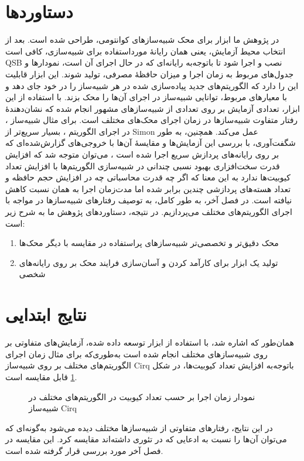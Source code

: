 \section{دستاوردها}
در پژوهش ما ابزار
برای محک شبیه‌سازهای کوانتومی، طراحی شده است. بعد از انتخاب محیط آزمایش، یعنی همان رایانهٔ مورداستفاده برای شبیه‌سازی، کافی است QSB نصب و اجرا شود تا باتوجه‌به رایانه‌ای که در حال اجرای آن است، نمودارها و جدول‌های مربوط به زمان اجرا و میزان حافظهٔ مصرفی، تولید شوند. این ابزار قابلیت این را دارد که الگوریتم‌های جدید پیاده‌سازی شده در هر شبیه‌ساز را در خود جای دهد و با معیارهای مربوط، توانایی شبیه‌ساز در اجرای آن‌ها را محک بزند. با استفاده از این ابزار، تعدادی آزمایش بر روی تعدادی از شبیه‌سازهای مشهور انجام شده که نشان‌دهندهٔ رفتار متفاوت شبیه‌سازها در زمان اجرای محک‌های مختلف است. برای مثال شبیه‌ساز
،
 در اجرای الگوریتم
،
بسیار سریع‌تر از Simon عمل می‌کند. همچنین، به طور شگفت‌آوری، با بررسی این آزمایش‌ها و مقایسهٔ آن‌ها با خروجی‌های گزارش‌شده‌ای که بر روی رایانه‌های پردازش سریع اجرا شده است
\cite{jamadagni_benchmarking_2024}،
می‌توان متوجه شد که افزایش قدرت سخت‌افزاری بهبود نسبی چندانی در شبیه‌سازی الگوریتم‌ها با افزایش تعداد کیوبیت‌ها ندارد به این معنا که اگر چه قدرت محاسباتی چه در افزایش حجم حافظه و تعداد هسته‌های پردازشی چندین برابر شده اما مدت‌زمان اجرا به همان نسبت کاهش نیافته است. در فصل آخر، به طور کامل، به توصیف رفتارهای شبیه‌سازها در مواجه با اجرای الگوریتم‌های مختلف می‌پردازیم. در نتیجه، دستاوردهای  پژوهش ما به شرح زیر است:
\begin{enumerate}[label=\arabic*{-}]
	\item محک دقیق‌تر و تخصصی‌تر شبیه‌سازهای پراستفاده در مقایسه با دیگر محک‌ها
	\item تولید یک ابزار برای کارآمد کردن و آسان‌سازی فرایند محک بر روی رایانه‌های شخصی
\end{enumerate}

\section{نتایج ابتدایی}
همان‌طور که اشاره شد، با استفاده از ابزار توسعه داده شده، آزمایش‌های متفاوتی بر روی شبیه‌سازهای مختلف انجام شده است به‌طوری‌که برای مثال زمان اجرای الگوریتم‌های مختلف بر روی شبیه‌ساز Cirq باتوجه‌به افزایش تعداد کیوبیت‌ها، در شکل
\ref{fig:1}
قابل مقایسه است.
\begin{figure}
	\centering
	\captionsetup{justification=centering,margin*=0.5cm}
	
	\caption[نمودار زمان اجرا Cirq]{
	نمودار زمان اجرا بر حسب تعداد کیوبیت در الگوریتم‌های مختلف در شبیه‌ساز Cirq}
	\label{fig:1}
\end{figure}

در این نتایج، رفتارهای متفاوتی از شبیه‌سازها مختلف دیده می‌شود به‌گونه‌ای که می‌توان آن‌ها را نسبت به ادعایی که در تئوری داشته‌اند مقایسه کرد. این مقایسه در فصل آخر مورد بررسی قرار گرفته شده است.